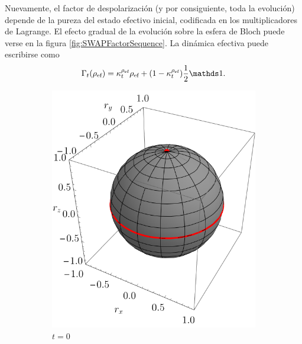 Nuevamente, el factor de despolarización (y por consiguiente, toda la evolución) depende de la pureza del estado efectivo inicial, codificada en los multiplicadores de Lagrange. El efecto gradual de la evolución sobre la esfera de Bloch puede verse en la figura \ref{fig:SWAPFactorSequence}. La dinámica efectiva puede escribirse como
\begin{equation}\label{eq:EffectiveSWAPt}
  \Gamma_{t}(\rho_{\ef})=\kappa_{t}^{\rho_{\ef}}\rho_{\ef}+(1-\kappa_{t}^{\rho_{\ef}})\frac{1}{2}\Id.
\end{equation}

\begin{figure}[ht!]
  \centering
  \begin{subfigure}{0.32\textwidth}
    \centering
    \includegraphics[width=0.9\linewidth]{chapter4/figures_toy/SWAP_t=0._p=0.9_r=0.9.pdf}
    \caption{$t=0$}
  \end{subfigure}%
  \begin{subfigure}{0.32\textwidth}
    \centering

\end{subfigure}
\end{figure}
